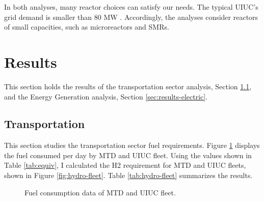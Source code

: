 In both analyses, many reactor choices can satisfy our needs.
The typical \gls{UIUC}'s grid demand is smaller than 80 MW \cite{dotson_optimal_2020}.
Accordingly, the analyses consider reactors of small capacities, such as microreactors and \glspl{SMR}.


\section{Results}
\label{sec:hydro-results}

This section holds the results of the transportation sector analysis, Section \ref{sec:results-transport}, and the Energy Generation analysis, Section \ref{sec:results-electric}.

\subsection{Transportation}
\label{sec:results-transport}

This section studies the transportation sector fuel requirements.
Figure \ref{fig:fuel} displays the fuel consumed per day by \gls{MTD} and \gls{UIUC} fleet.
Using the values shown in Table \ref{tab:equiv}, I calculated the \gls{H2} requirement for MTD and UIUC fleets, shown in Figure \ref{fig:hydro-fleet}.
Table \ref{tab:hydro-fleet} summarizes the results.

	\begin{figure}[htbp!]
		\centering
		\hfill
		\caption{Fuel consumption data of MTD and UIUC fleet.}
		\label{fig:fuel}
	\end{figure}

